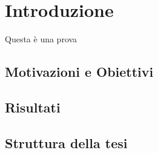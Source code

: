 \chapter{Introduzione}
Questa è una prova

\section{Motivazioni e Obiettivi} %

\section{Risultati}

\section{Struttura della tesi}
